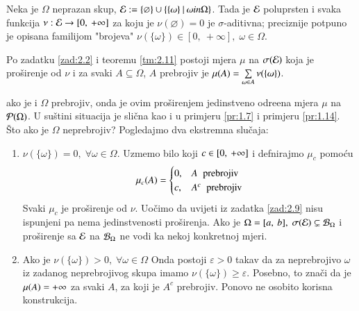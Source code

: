 \begin{nap} \label{nap:2.12}
    Neka je $\Omega$ neprazan skup, $\mathcal{E} := \{\varnothing\} \cup
    \{{\{ \omega \}} \: | \: {\omega in \Omega}\}$. Tada je $\mathcal{E}$
    poluprsten i svaka funkcija $\nu: \mathcal{E} \to [0, \: +\infty]$
    za koju je $\nu(\varnothing) = 0$ je $\sigma$-aditivna;
    preciznije potpuno je opisana familijom "brojeva"
    $\nu(\{ \omega \}) \in [0, \: +\infty], \; \omega \in \Omega$.

    Po zadatku \ref{zad:2.2} i teoremu \ref{tm:2.11} postoji mjera
    $\mu$ na $\sigma({\mathcal{E}})$ koja je pro\v sirenje od $\nu$ i za svaki
    $A \subseteq \Omega$, $A$ prebrojiv je $\mu({A})
    = \sum\limits_{\omega \in A}^{} \nu(\{ \omega \})$.

    ako je i $\Omega$ prebrojiv, onda je ovim pro\v sirenjem
    jedinstveno odre\dj ena mjera $\mu$ na $\mathcal{P}({\Omega})$.
    U su\v stini situacija je sli\v cna kao i u primjeru
    \ref{pr:1.7} i primjeru \ref{pr:1.14}.
    \v Sto ako je $\Omega$ neprebrojiv?
    Pogledajmo dva ekstremna slu\v caja:
    \begin{enumerate}[label=(\roman*)]
        \item $\nu(\{ \omega \}) = 0, \; \forall \omega \in \Omega$.
            Uzmemo bilo koji $c \in [{0}, \:{+\infty}]$ i defnirajmo
            $\mu_c$ pomo\' cu
            \begin{equation*}
                \mu_c(A) = 
                \begin{cases}
                    0, &A \;\; \textnormal{prebrojiv}\\
                    c, &A^c \;\; \textnormal{prebrojiv}
                \end{cases}
            \end{equation*}
            Svaki $\mu_c$ je pro\v sirenje od $\nu$. Uo\v cimo da
            uvijeti iz zadatka \ref{zad:2.9} nisu ispunjeni pa nema
            jedinstvenosti pro\v sirenja. Ako je $\Omega
            = [{a}, \:{b}], \; \sigma({\mathcal{E}})
            \subsetneq \mathcal{B}_{\Omega}$ i pro\v sirenje sa $\mathcal{E}$ na
            $\mathcal{B}_{\Omega}$ ne vodi ka nekoj konkretnoj mjeri.
        \item Ako je $\nu(\{\omega\}) > 0, \; \forall \omega \in
            \Omega$ Onda postoji $\varepsilon > 0$ takav da za
            neprebrojivo $\omega$ iz zadanog neprebrojivog skupa
            imamo $\nu(\{\omega\}) \geq \varepsilon$.
            Posebno, to zna\v ci da je $\mu({A}) = +\infty$ za svaki
            $A$, za koji je $A^c$ prebrojiv. Ponovo ne osobito
            korisna konstrukcija.
    \end{enumerate}
\end{nap}

